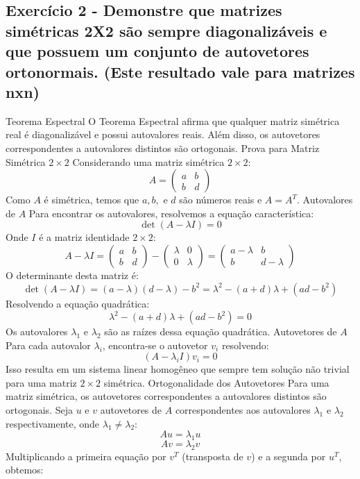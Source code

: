 {{{\subsection{Exercício 2 - Demonstre que matrizes simétricas 2X2 são sempre diagonalizáveis e que possuem um conjunto
de autovetores ortonormais. (Este resultado vale para matrizes nxn)}
Teorema Espectral
O Teorema Espectral afirma que qualquer matriz simétrica real é diagonalizável e possui autovalores reais. Além disso, os autovetores correspondentes a autovalores distintos são ortogonais.
Prova para Matriz Simétrica \(2 \times 2\)
Considerando uma matriz simétrica \(2 \times 2\):
\[ A = \begin{pmatrix} a & b \\ b & d \end{pmatrix} \]
Como \(A\) é simétrica, temos que \(a, b,\) e \(d\) são números reais e \(A = A^T\).
Autovalores de \(A\)
Para encontrar os autovalores, resolvemos a equação característica:
\[ \det(A - \lambda I) = 0 \]
Onde \(I\) é a matriz identidade \(2 \times 2\):
\[ A - \lambda I = \begin{pmatrix} a & b \\ b & d \end{pmatrix} - \begin{pmatrix} \lambda & 0 \\ 0 & \lambda \end{pmatrix} = \begin{pmatrix} a - \lambda & b \\ b & d - \lambda \end{pmatrix} \]
O determinante desta matriz é:
\[ \det(A - \lambda I) = (a - \lambda)(d - \lambda) - b^2 = \lambda^2 - (a + d)\lambda + (ad - b^2) \]
Resolvendo a equação quadrática:
\[ \lambda^2 - (a + d)\lambda + (ad - b^2) = 0 \]
Os autovalores \(\lambda_1\) e \(\lambda_2\) são as raízes dessa equação quadrática.
Autovetores de \(A\)
Para cada autovalor \(\lambda_i\), encontra-se o autovetor \(v_i\) resolvendo:
\[ (A - \lambda_i I)v_i = 0 \]
Isso resulta em um sistema linear homogêneo que sempre tem solução não trivial para uma matriz \(2 \times 2\) simétrica.
Ortogonalidade dos Autovetores
Para uma matriz simétrica, os autovetores correspondentes a autovalores distintos são ortogonais. 
Seja \(u\) e \(v\) autovetores de \(A\) correspondentes aos autovalores \(\lambda_1\) e \(\lambda_2\) respectivamente, onde \(\lambda_1 \neq \lambda_2\):
\[ A u = \lambda_1 u \]
\[ A v = \lambda_2 v \]
Multiplicando a primeira equação por \(v^T\) (transposta de \(v\)) e a segunda por \(u^T\), obtemos:
}}}
